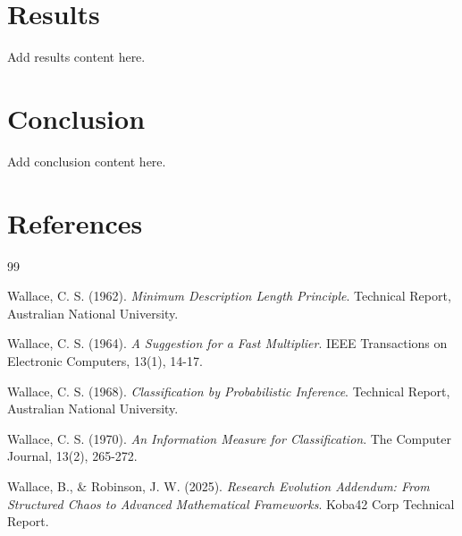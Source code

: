 \documentclass[12pt]{article}
\begin{document}
\section{Results}
\label{sec:results}

Add results content here.


\section{Conclusion}
\label{sec:conclusion}

Add conclusion content here.

\section{References}

\begin{thebibliography}{99}

Wallace, C. S. (1962). \textit{Minimum Description Length Principle}. Technical Report, Australian National University.

Wallace, C. S. (1964). \textit{A Suggestion for a Fast Multiplier}. IEEE Transactions on Electronic Computers, 13(1), 14-17.

Wallace, C. S. (1968). \textit{Classification by Probabilistic Inference}. Technical Report, Australian National University.

Wallace, C. S. (1970). \textit{An Information Measure for Classification}. The Computer Journal, 13(2), 265-272.

Wallace, B., \& Robinson, J. W. (2025). \textit{Research Evolution Addendum: From Structured Chaos to Advanced Mathematical Frameworks}. Koba42 Corp Technical Report.

\end{thebibliography}
\end{document}
